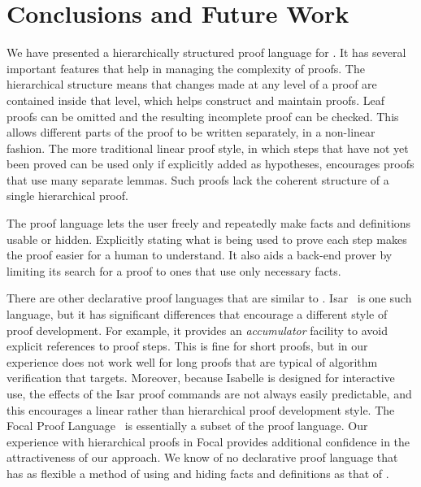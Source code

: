 \documentclass[a4paper]{easychair}
\begin{document}
\section{Conclusions and Future Work}
\label{sec:conclusions}

We have presented a hierarchically structured proof language for
\tlaplus.  It has several important features that help in managing the
complexity of proofs.  The hierarchical structure means that changes
made at any level of a proof are contained inside that level, which
helps construct and maintain proofs.  Leaf proofs can be omitted and
the resulting incomplete proof can be checked.  This allows different parts
of the proof to be written separately, in a non-linear fashion.
The more traditional linear proof style, in which steps that have not
yet been proved can be used only if explicitly added as hypotheses,
encourages proofs that use many separate lemmas.  Such proofs lack the
coherent structure of a single hierarchical proof.

The proof language lets the user freely and repeatedly make facts and
definitions usable or hidden.  Explicitly stating what is being used
to prove each step makes the proof easier for a human to understand.
It also aids a back-end prover by limiting its search for a proof
to ones that use only necessary facts.

There are other declarative proof languages that are similar to
\tlatwo. Isar~\cite{isar} is one such language, but it has significant
differences that encourage a different style of proof development.
For example, 
it provides an \emph{accumulator} facility to avoid explicit
references to proof steps.  This is fine for short proofs, but in
our experience does not work well for long proofs that are typical of
algorithm verification that \tlatwo{} targets.
Moreover, because Isabelle is designed for interactive use, the
effects of the Isar proof commands are not always easily predictable, and
this encourages a linear rather than hierarchical proof development
style.
\nocite{rudnicki:mizar}The Focal Proof Language~\cite{focal} is essentially a subset of the
\tlatwo proof language.  Our experience with hierarchical proofs in
Focal provides additional confidence in the attractiveness of our
approach.  We know of no declarative proof language that has as
flexible a method of using and hiding facts and definitions as that of
\tlatwo.
\end{document}
